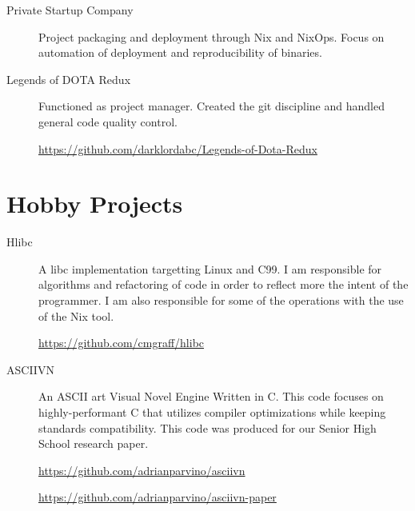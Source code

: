 \documentclass{article}
\begin{document}
\begin{description}
\item [Private Startup Company] Project packaging and deployment through
  Nix and NixOps. Focus on automation of deployment and reproducibility of binaries.

\item [Legends of DOTA Redux] Functioned as project manager. Created the git
  discipline and handled general code quality control.

  \href{https://github.com/darklordabc/Legends-of-Dota-Redux}{https://github.com/darklordabc/Legends-of-Dota-Redux}
\end{description}

\hrulefill
\section*{Hobby Projects}

\begin {description}
\item [Hlibc] A libc implementation targetting Linux and C99. I am responsible
  for algorithms and refactoring of code in order to reflect more
  the intent of the programmer. I am also responsible for some of the operations
  with the use of the Nix tool.

  \href{https://github.com/cmgraff/hlibc}{https://github.com/cmgraff/hlibc}

\item [ASCIIVN] An ASCII art Visual Novel Engine Written in C.
  This code focuses on highly-performant C that utilizes compiler optimizations
  while keeping standards compatibility.
  This code was produced for our Senior High School research paper.

  \href{https://github.com/adrianparvino/asciivn}{https://github.com/adrianparvino/asciivn}

  \href{https://github.com/adrianparvino/asciivn-paper}{https://github.com/adrianparvino/asciivn-paper}

\end{description}
\end{document}
